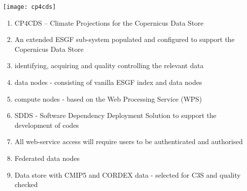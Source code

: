 \documentclass[portrait,a0paper,fontscale=0.4]{baposter} %
\newcommand{\compresslist}{%
\setlength{\itemsep}{1pt}%
\setlength{\parskip}{0pt}%
\setlength{\parsep}{0pt}%
}
\begin{document}
\begin{poster}
{    %







    \texttt{[image: cp4cds]}

    \begin{enumerate}\compresslist
      \item CP4CDS – Climate Projections for the Copernicus Data Store
      \item An extended ESGF sub-system populated and configured to support the Copernicus Data Store
      \item identifying, acquiring and quality controlling the relevant data
      \item data nodes - consisting of vanilla ESGF index and data nodes
      \item compute nodes - based on the Web Processing Service (WPS)
      \item SDDS - Software Dependency Deployment Solution to support the development of codes
      \item All web-service access will require users to be authenticated and authorised
      \item Federated data nodes
      \item Data store with CMIP5 and CORDEX data - selected for C3S and quality checked
    \end{enumerate}
    \vspace{0.3em}
  }


\end{poster}
\end{document}
